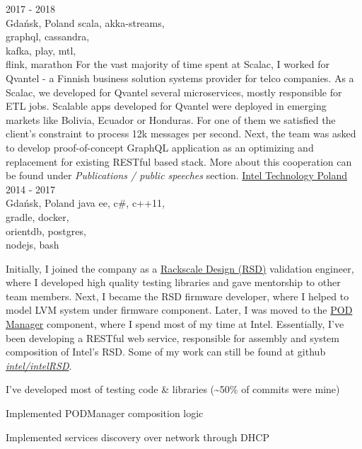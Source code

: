 \documentclass[a4paper,11pt]{cv4tw}%
\begin{document}
      {2017 - 2018\\Gdańsk, Poland}
      {scala, akka-streams,\\graphql, cassandra,\\kafka, play, mtl,\\flink, marathon}
      {For the vast majority of time spent at Scalac, I worked for Qvantel - a Finnish business solution
        systems provider for telco companies. As a Scalac, we developed for Qvantel several microservices,
        mostly responsible for ETL jobs. Scalable apps developed for Qvantel were deployed in emerging markets
        like Bolivia, Ecuador or Honduras. For one of them we satisfied the client's constraint
        to process \approx12k messages per second. Next, the team was asked to develop proof-of-concept
        GraphQL application as an optimizing and replacement for existing RESTful based stack. More about this
        cooperation can be found under \emph{Publications / public speeches} section.
      }
      {\href{https://www.intel.com/content/www/us/en/jobs/locations/poland.html}
        {Intel Technology Poland}}
      {2014 - 2017\\Gdańsk, Poland}
      {java ee, c\#, c++11,\\gradle, docker,\\orientdb, postgres,\\nodejs, bash}
      {Initially, I joined the company as a \href{https://www.intel.com/intelRSD}{Rackscale Design (RSD)} validation engineer, where
        I developed high quality testing libraries and gave mentorship to other team members. Next, I became the RSD firmware developer,
        where I helped to model LVM system under firmware component. Later, I was moved to the
        \href{https://www.intel.com/content/www/us/en/architecture-and-technology/rack-scale-design/pod-manager-user-guide-v2-1.html}{POD Manager} component,
        where I spend most of my time at Intel. Essentially, I've been developing a RESTful web service, responsible
        for assembly and system composition of Intel's RSD. Some of my work can still be found at github
        \emph{\href{https://github.com/intel/intelRSD}{intel/intelRSD}}.
        \begin{missions}
        \item I've developed most of testing code \& libraries (\textasciitilde50\% of commits were mine)
        \item Implemented PODManager composition logic
        \item Implemented services discovery over network through DHCP
        \end{missions}
      }      
\end{document}
